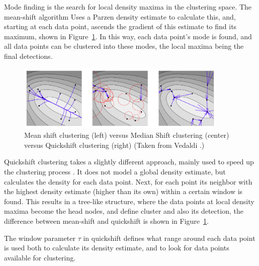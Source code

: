 Mode finding is the search for local density maxima in the clustering space. The mean-shift algorithm \cite{cheng1995mean} Uses a Parzen density estimate to calculate this, and, starting at each data point, ascends the gradient of this estimate to find its maximum, shown in Figure~\ref{fig:ms_qs}. In this way, each data point's mode is found, and all data points can be clustered into these modes, the local maxima being the final detections.

\begin{figure}[hbt]
    \centering
    \includegraphics[width=0.9\textwidth]{MeanshiftMedianshiftQuickshift}
    \caption{Mean shift clustering (left) versus Median Shift clustering (center) versus Quickshift clustering (right) (Taken from Vedaldi \cite{vedaldi2008quick}.)}
    \label{fig:ms_qs}
\end{figure}

Quickshift clustering takes a slightly different approach, mainly used to speed up the clustering process \cite{vedaldi2008quick}. It does not model a global density estimate, but calculates the density for each data point. Next, for each point its neighbor with the highest density estimate (higher than its own) within a certain window is found. This results in a tree-like structure, where the data points at local density maxima become the head nodes, and define cluster and also its detection, the difference between mean-shift and quickshift is shown in Figure~\ref{fig:ms_qs}.

The window parameter $\tau$ in quickshift defines what range around each data point is used both to calculate its density estimate, and to look for data points available for clustering.



